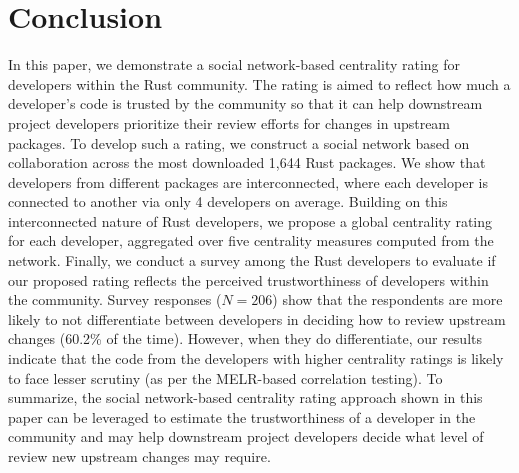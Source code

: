 \documentclass[10pt,journal,compsoc]{IEEEtran}
\begin{document}
\section{Conclusion}
\label{conclusion}
In this paper, we demonstrate a social network-based centrality rating for developers within the Rust community. The rating is aimed to reflect how much a developer's code is trusted by the community so that it can help downstream project developers prioritize their review efforts for changes in upstream packages. To develop such a rating, we construct a social network based on collaboration across the most downloaded 1,644 Rust packages. We show that developers from different packages are interconnected, where each developer is connected to another via only 4 developers on average. Building on this interconnected nature of Rust developers, we propose a global centrality rating for each developer, aggregated over five centrality measures computed from the network. Finally, we conduct a survey among the Rust developers to evaluate if our proposed rating reflects the perceived trustworthiness of developers within the community. Survey responses ($N=206$) show that the respondents are more likely to not differentiate between developers in deciding how to review upstream changes (60.2\% of the time). However, when they do differentiate, our results indicate that the code from the developers with higher centrality ratings is likely to face lesser scrutiny (as per the MELR-based correlation testing). To summarize, the social network-based centrality rating approach shown in this paper can be leveraged to estimate the trustworthiness of a developer in the community and may help downstream project developers decide what level of review new upstream changes may require.





\end{document}
